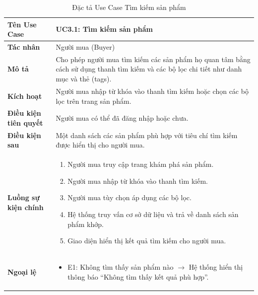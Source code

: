 \begin{table}[H]
\centering
\begin{tabularx}{\textwidth}{|l|X|}
\hline
\textbf{Tên Use Case} & \textbf{UC3.1: Tìm kiếm sản phẩm} \\ \hline
\textbf{Tác nhân} & Người mua (Buyer) \\ \hline
\textbf{Mô tả} & Cho phép người mua tìm kiếm các sản phẩm họ quan tâm bằng cách sử dụng thanh tìm kiếm và các bộ lọc chi tiết như danh mục và thẻ (tags). \\ \hline
\textbf{Kích hoạt} & Người mua nhập từ khóa vào thanh tìm kiếm hoặc chọn các bộ lọc trên trang sản phẩm. \\ \hline
\textbf{Điều kiện tiên quyết} & Người mua có thể đã đăng nhập hoặc chưa. \\ \hline
\textbf{Điều kiện sau} & Một danh sách các sản phẩm phù hợp với tiêu chí tìm kiếm được hiển thị cho người mua. \\ \hline
\textbf{Luồng sự kiện chính} & 
\begin{enumerate}
    \item Người mua truy cập trang khám phá sản phẩm.
    \item Người mua nhập từ khóa vào thanh tìm kiếm.
    \item Người mua tùy chọn áp dụng các bộ lọc.
    \item Hệ thống truy vấn cơ sở dữ liệu và trả về danh sách sản phẩm khớp.
    \item Giao diện hiển thị kết quả tìm kiếm cho người mua.
\end{enumerate} \\ \hline
\textbf{Ngoại lệ} & 
\begin{itemize}
    \item E1: Không tìm thấy sản phẩm nào $\rightarrow$ Hệ thống hiển thị thông báo ``Không tìm thấy kết quả phù hợp''.
\end{itemize} \\ \hline
\end{tabularx}
\caption{Đặc tả Use Case Tìm kiếm sản phẩm}
\end{table}

